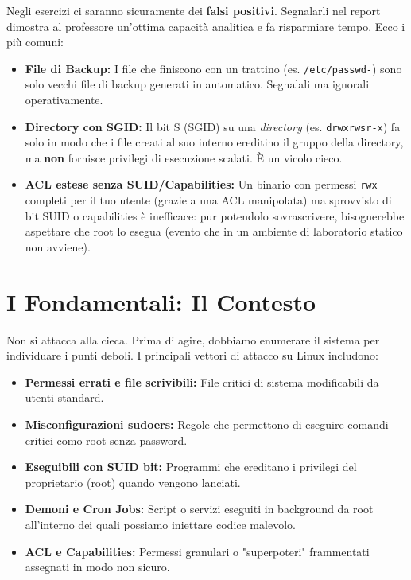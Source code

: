 \documentclass[12pt,a4paper]{report}
\begin{document}
	\begin{nota}
		Negli esercizi ci saranno sicuramente dei \textbf{falsi positivi}. Segnalarli nel report dimostra al professore un'ottima capacità analitica e fa risparmiare tempo. Ecco i più comuni:
		\begin{itemize}
			\item \textbf{File di Backup:} I file che finiscono con un trattino (es. \texttt{/etc/passwd-}) sono solo vecchi file di backup generati in automatico. Segnalali ma ignorali operativamente.
			\item \textbf{Directory con SGID:} Il bit S (SGID) su una \textit{directory} (es. \texttt{drwxrwsr-x}) fa solo in modo che i file creati al suo interno ereditino il gruppo della directory, ma \textbf{non} fornisce privilegi di esecuzione scalati. È un vicolo cieco.
			\item \textbf{ACL estese senza SUID/Capabilities:} Un binario con permessi \texttt{rwx} completi per il tuo utente (grazie a una ACL manipolata) ma sprovvisto di bit SUID o capabilities è inefficace: pur potendolo sovrascrivere, bisognerebbe aspettare che root lo esegua (evento che in un ambiente di laboratorio statico non avviene).
		\end{itemize}
	\end{nota}
	

	\section{I Fondamentali: Il Contesto}
	Non si attacca alla cieca. Prima di agire, dobbiamo enumerare il sistema per individuare i punti deboli. I principali vettori di attacco su Linux includono:
	\begin{itemize}
		\item \textbf{Permessi errati e file scrivibili:} File critici di sistema modificabili da utenti standard.
		\item \textbf{Misconfigurazioni sudoers:} Regole che permettono di eseguire comandi critici como root senza password.
		\item \textbf{Eseguibili con SUID bit:} Programmi che ereditano i privilegi del proprietario (root) quando vengono lanciati.
		\item \textbf{Demoni e Cron Jobs:} Script o servizi eseguiti in background da root all'interno dei quali possiamo iniettare codice malevolo.
		\item \textbf{ACL e Capabilities:} Permessi granulari o "superpoteri" frammentati assegnati in modo non sicuro.
	\end{itemize}
	
\end{document}
